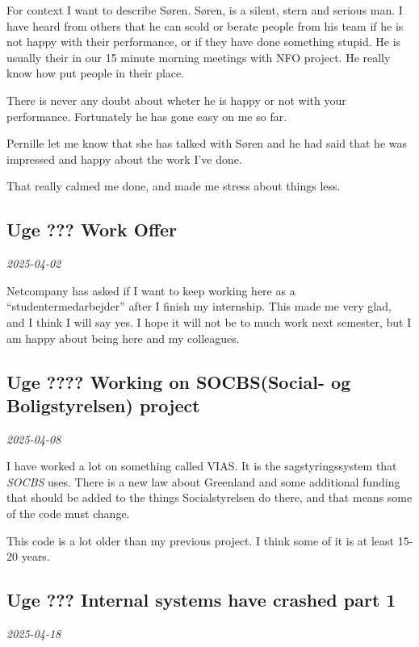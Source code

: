 \documentclass[../main.tex]{subfiles}
\begin{document}
For context I want to describe Søren. Søren, is a silent, stern and serious man. I have heard from others that he can scold or berate people from his team if he is not happy with their performance, or if they have done something stupid. He is usually their in our 15 minute morning meetings with NFO project. He really know how put people in their place.

There is never any doubt about wheter he is happy or not with your performance. Fortunately he has gone easy on me so far.

Pernille let me know that she has talked with Søren and he had said that he was impressed and happy about the work I've
done.

That really calmed me done, and made me stress about things less. \\

\subsection{Uge ??? \textbf{Work Offer}}

\textit{2025-04-02}

Netcompany has asked if I want to keep working here as a
``studentermedarbejder'' after I finish my internship. This made me very
glad, and I think I will say yes. I hope it will not be to much work
next semester, but I am happy about being here and my colleagues. \\

\subsection{Uge ???? \textbf{Working on SOCBS(Social- og Boligstyrelsen) project}}

\textit{2025-04-08}

I have worked a lot on something called VIAS. It is the sagstyringssystem that \textit{SOCBS} uses. There is a new law about Greenland and some additional funding that should be added to the things Socialstyrelsen do there, and that means some of the code must change.

This code is a lot older than my previous project. I think some of it is at least 15-20 years. 

\subsection{Uge ??? \textbf{Internal systems have crashed part 1}}

\textit{2025-04-18}
\end{document}
